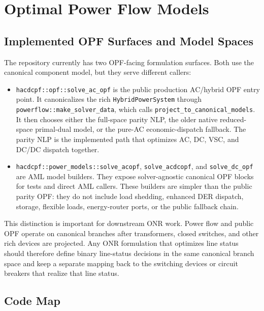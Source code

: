\section{Optimal Power Flow Models}
\label{sec:opf}

\subsection{Implemented OPF Surfaces and Model Spaces}

The repository currently has two OPF-facing formulation surfaces.  Both use the
canonical component model, but they serve different callers:
\begin{itemize}
  \item \texttt{hacdcpf::opf::solve\_ac\_opf} is the public production AC/hybrid
  OPF entry point.  It canonicalizes the rich \texttt{HybridPowerSystem} through
  \texttt{powerflow::make\_solver\_data}, which calls
  \texttt{project\_to\_canonical\_models}.  It then chooses either the
  full-space parity NLP, the older native reduced-space primal-dual model, or
  the pure-AC economic-dispatch fallback.  The parity NLP is the implemented
  path that optimizes AC, DC, VSC, and DC/DC dispatch together.
  \item \texttt{hacdcpf::power\_models::solve\_acopf},
  \texttt{solve\_acdcopf}, and \texttt{solve\_dc\_opf} are AML model builders.
  They expose solver-agnostic canonical OPF blocks for tests and direct AML
  callers.  These builders are simpler than the public parity OPF: they do not
  include load shedding, enhanced DER dispatch, storage, flexible loads,
  energy-router ports, or the public fallback chain.
\end{itemize}

This distinction is important for downstream ONR work.  Power flow and public
OPF operate on canonical branches after transformers, closed switches, and
other rich devices are projected.  Any ONR formulation that optimizes line
status should therefore define binary line-status decisions in the same
canonical branch space and keep a separate mapping back to the switching
devices or circuit breakers that realize that line status.

\subsection{Code Map}

